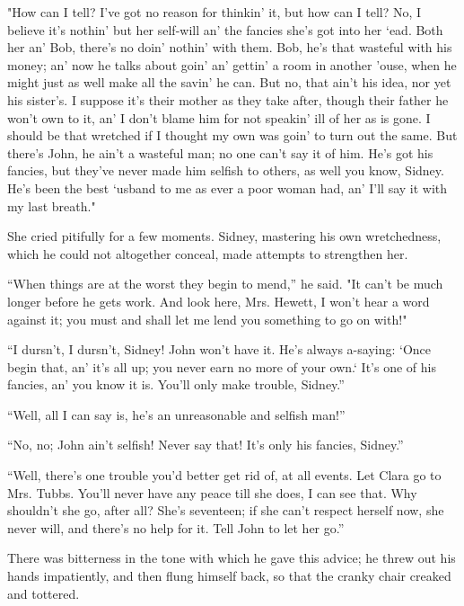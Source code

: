 "How can I tell? I've got no reason for thinkin' it, but how can I tell?
No, I believe it's nothin' but her self-will an' the fancies she's got
into her `ead. Both her an' Bob, there's no doin' nothin' with them.
{\protect\hypertarget{40}{}{}}Bob, he's that wasteful with his money;
an' now he talks about goin' an' gettin' a room in another 'ouse, when
he might just as well make all the savin' he can. But no, that ain't his
idea, nor yet his sister's. I suppose it's their mother as they take
after, though their father he won't own to it, an' I don't blame him for
not speakin' ill of her as is gone. I should be that wretched if I
thought my own was goin' to turn out the same. But there's John, he
ain't a wasteful man; no one can't say it of him. He's got his fancies,
but they've never made him selfish to others, as well you know, Sidney.
He's been the best `usband to me as ever a poor woman had, an' I'll say
it with my last breath."

She cried pitifully for a few moments. Sidney, mastering his own
wretchedness, which he could not altogether conceal, made attempts to
strengthen her.

``When things are at the worst they begin to mend,'' he said. "It can't
be much longer before he gets work. And look here, Mrs. Hewett, I won't
hear a word against it; you {\protect\hypertarget{41}{}{}}must and shall
let me lend you something to go on with!"

``I dursn't, I dursn't, Sidney! John won't have it. He's always
a-saying: `Once begin that, an' it's all up; you never earn no more of
your own.` It's one of his fancies, an' you know it is. You'll only make
trouble, Sidney.''

``Well, all I can say is, he's an unreasonable and selfish man!''

``No, no; John ain't selfish! Never say that! It's only his fancies,
Sidney.''

``Well, there's one trouble you'd better get rid of, at all events. Let
Clara go to Mrs. Tubbs. You'll never have any peace till she does, I can
see that. Why shouldn't she go, after all? She's seventeen; if she can't
respect herself now, she never will, and there's no help for it. Tell
John to let her go.''

There was bitterness in the tone with which he gave this advice; he
threw out his hands impatiently, and then flung himself back, so that
the cranky chair creaked and tottered.

